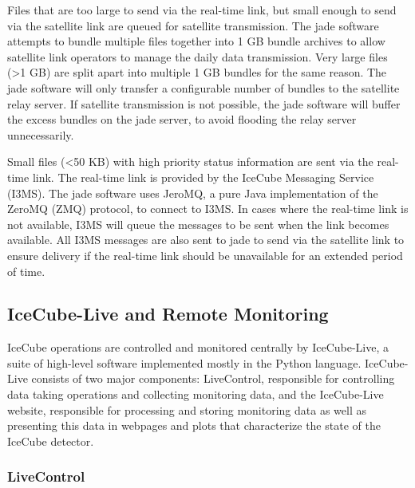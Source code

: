 Files that are too large to send via the real-time link, but small enough to send via the satellite link are queued for satellite transmission. The jade software
attempts to bundle multiple files together into 1 GB bundle archives to allow satellite link operators to manage the daily data transmission. Very large files
(>1 GB) are split apart into multiple 1 GB bundles for the same reason. The jade software will only transfer a configurable number of bundles to the satellite
relay server. If satellite transmission is not possible, the jade software will buffer the excess bundles on the jade server, to avoid flooding the relay server
unnecessarily.


Small files (<50 KB) with high priority status information are sent via the real-time link. The real-time link is provided by the IceCube Messaging Service
(I3MS). The jade software uses JeroMQ, a pure Java implementation of the ZeroMQ (ZMQ) protocol, to connect to I3MS. In cases where the real-time link is not
available, I3MS will queue the messages to be sent when the link becomes available. All I3MS messages are also sent to jade to send via the satellite link to
ensure delivery if the real-time link should be unavailable for an extended period of time.

\subsection{IceCube-Live and Remote Monitoring}

IceCube operations are controlled and monitored centrally by IceCube-Live, a suite of high-level software implemented mostly in the Python language.
IceCube-Live consists of two major components: LiveControl, responsible for controlling data taking operations and
collecting monitoring data, and the IceCube-Live website, responsible for processing and storing monitoring data as well as presenting this data
in webpages and plots that characterize the state of the IceCube detector.

\subsubsection{LiveControl}

